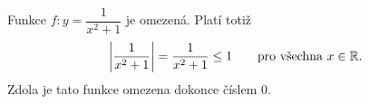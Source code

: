 \begin{mdframed}[style=mdexam]
  \begin{example}\label{MAI:exam023}
    Funkce $f:y=\dfrac{1}{x^2+1}$ je omezená. Platí totiž 
    \begin{equation*}
      \left\lvert\frac{1}{x^2+1}\right\rvert=\frac{1}{x^2+1}\leq1 
      \qquad \text{pro všechna }x\in\mathbb{R}.
    \end{equation*}
    Zdola je tato funkce omezena dokonce číslem $0$.  
  \end{example}
\end{mdframed}